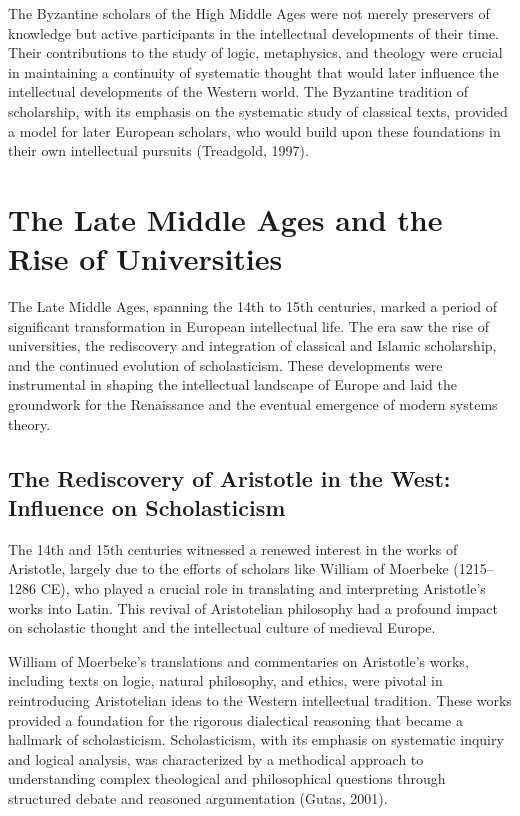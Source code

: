 \documentclass[twocolumn]{article}
\begin{document}
\textcolor{secondary}{The Byzantine scholars of the High Middle Ages were not merely preservers of knowledge but active participants in the intellectual developments of their time. Their contributions to the study of logic, metaphysics, and theology were crucial in maintaining a continuity of systematic thought that would later influence the intellectual developments of the Western world. The Byzantine tradition of scholarship, with its emphasis on the systematic study of classical texts, provided a model for later European scholars, who would build upon these foundations in their own intellectual pursuits (Treadgold, 1997).}

\section{The Late Middle Ages and the Rise of Universities}

\textcolor{primary}{The Late Middle Ages, spanning the 14th to 15th centuries, marked a period of significant transformation in European intellectual life. The era saw the rise of universities, the rediscovery and integration of classical and Islamic scholarship, and the continued evolution of scholasticism. These developments were instrumental in shaping the intellectual landscape of Europe and laid the groundwork for the Renaissance and the eventual emergence of modern systems theory.}

\subsection{The Rediscovery of Aristotle in the West: Influence on Scholasticism}

\textcolor{primary}{The 14th and 15th centuries witnessed a renewed interest in the works of Aristotle, largely due to the efforts of scholars like William of Moerbeke (1215–1286 CE), who played a crucial role in translating and interpreting Aristotle’s works into Latin. This revival of Aristotelian philosophy had a profound impact on scholastic thought and the intellectual culture of medieval Europe.}

\textcolor{secondary}{William of Moerbeke’s translations and commentaries on Aristotle’s works, including texts on logic, natural philosophy, and ethics, were pivotal in reintroducing Aristotelian ideas to the Western intellectual tradition. These works provided a foundation for the rigorous dialectical reasoning that became a hallmark of scholasticism. Scholasticism, with its emphasis on systematic inquiry and logical analysis, was characterized by a methodical approach to understanding complex theological and philosophical questions through structured debate and reasoned argumentation (Gutas, 2001).}
\end{document}
